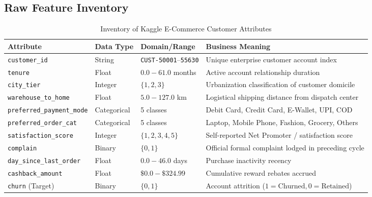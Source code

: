 \documentclass[11pt,a4paper]{article}
\begin{document}
\subsection{Raw Feature Inventory}
\begin{table}[H]
    \centering
    \small
    \caption{Inventory of Kaggle E-Commerce Customer Attributes}
    \begin{tabular}{lllp{6cm}}
        \toprule
        \textbf{Attribute} & \textbf{Data Type} & \textbf{Domain/Range} & \textbf{Business Meaning} \\
        \midrule
        \texttt{customer\_id} & String & \texttt{CUST-50001}--\texttt{55630} & Unique enterprise customer account index \\
        \texttt{tenure} & Float & $0.0 - 61.0$ months & Active account relationship duration \\
        \texttt{city\_tier} & Integer & $\{1, 2, 3\}$ & Urbanization classification of customer domicile \\
        \texttt{warehouse\_to\_home} & Float & $5.0 - 127.0$ km & Logistical shipping distance from dispatch center \\
        \texttt{preferred\_payment\_mode} & Categorical & 5 classes & Debit Card, Credit Card, E-Wallet, UPI, COD \\
        \texttt{preferred\_order\_cat} & Categorical & 5 classes & Laptop, Mobile Phone, Fashion, Grocery, Others \\
        \texttt{satisfaction\_score} & Integer & $\{1, 2, 3, 4, 5\}$ & Self-reported Net Promoter / satisfaction score \\
        \texttt{complain} & Binary & $\{0, 1\}$ & Official formal complaint lodged in preceding cycle \\
        \texttt{day\_since\_last\_order} & Float & $0.0 - 46.0$ days & Purchase inactivity recency \\
        \texttt{cashback\_amount} & Float & $\$0.0 - \$324.99$ & Cumulative reward rebates accrued \\
        \texttt{churn} (Target) & Binary & $\{0, 1\}$ & Account attrition ($1 = \text{Churned}, 0 = \text{Retained}$) \\
        \bottomrule
    \end{tabular}
\end{table}
\end{document}
